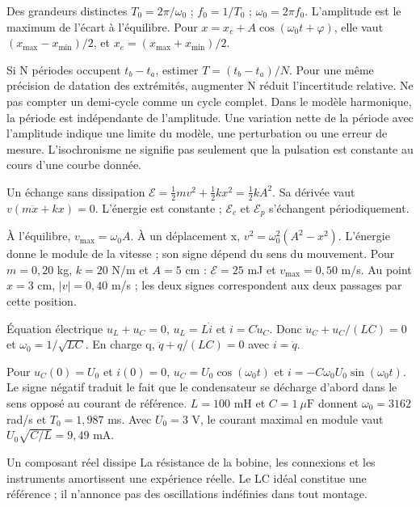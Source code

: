 \begin{loi}{Des grandeurs distinctes}
$T_0=2\pi/\omega_0$ ; $f_0=1/T_0$ ; $\omega_0=2\pi f_0$. L’amplitude est le maximum de l’écart à l’équilibre. Pour $x=x_e+A\cos(\omega_0t+\varphi)$, elle vaut $(x_{\max}-x_{\min})/2$, et $x_e=(x_{\max}+x_{\min})/2$.
\end{loi}
Si N périodes occupent $t_b-t_a$, estimer $T=(t_b-t_a)/N$. Pour une même précision de datation des extrémités, augmenter N réduit l’incertitude relative. Ne pas compter un demi-cycle comme un cycle complet.
Dans le modèle harmonique, la période est indépendante de l’amplitude. Une variation nette de la période avec l’amplitude indique une limite du modèle, une perturbation ou une erreur de mesure. L’isochronisme ne signifie pas seulement que la pulsation est constante au cours d’une courbe donnée.


\begin{loi}{Un échange sans dissipation}
$\mathcal E=\tfrac12mv^2+\tfrac12kx^2=\tfrac12kA^2$. Sa dérivée vaut $v(m\ddot x+kx)=0$. L’énergie est constante ; $\mathcal E_c$ et $\mathcal E_p$ s’échangent périodiquement.
\end{loi}
À l’équilibre, $v_{\max}=\omega_0A$. À un déplacement x, $v^2=\omega_0^2(A^2-x^2)$. L’énergie donne le module de la vitesse ; son signe dépend du sens du mouvement.
Pour $m=0{,}20$ kg, $k=20$ N/m et $A=5$ cm : $\mathcal E=25$ mJ et $v_{\max}=0{,}50$ m/s. Au point $x=3$ cm, $|v|=0{,}40$ m/s ; les deux signes correspondent aux deux passages par cette position.


\begin{loi}{Équation électrique}
$u_L+u_C=0$, $u_L=L\dot i$ et $i=C\dot u_C$. Donc $\ddot u_C+u_C/(LC)=0$ et $\omega_0=1/\sqrt{LC}$. En charge q, $\ddot q+q/(LC)=0$ avec $i=\dot q$.
\end{loi}
Pour $u_C(0)=U_0$ et $i(0)=0$, $u_C=U_0\cos(\omega_0t)$ et $i=-C\omega_0U_0\sin(\omega_0t)$. Le signe négatif traduit le fait que le condensateur se décharge d’abord dans le sens opposé au courant de référence.
$L=100$ mH et $C=1\ \mu\mathrm{ F}$ donnent $\omega_0=3162$ rad/s et $T_0=1{,}987$ ms. Avec $U_0=3$ V, le courant maximal en module vaut $U_0\sqrt{C/L}=9{,}49$ mA.
\begin{piege}{Un composant réel dissipe}
La résistance de la bobine, les connexions et les instruments amortissent une expérience réelle. Le LC idéal constitue une référence ; il n’annonce pas des oscillations indéfinies dans tout montage.
\end{piege}


